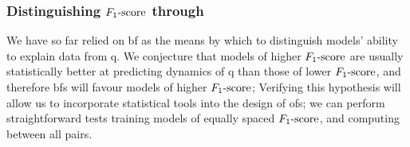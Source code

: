 \subsubsection{Distinguishing $ F_{1}\text{-score} $ through }\label{sec:bf_by_f_score}
We have so far relied on \gls{bf} as the means by which to distinguish models' 
    ability to explain data from \gls{q}. 
We conjecture that models of higher $ F_{1}\text{-score} $ are usually statistically better at predicting dynamics of \gls{q}
    than those of lower $ F_{1}\text{-score} $, and therefore \glspl{bf} will favour models of higher $ F_{1}\text{-score} $;
Verifying this hypothesis will allow us to incorporate statistical tools into the design of \glspl{of};
    we can perform straightforward tests training models of equally spaced $ F_{1}\text{-score} $, and computing  between all pairs.
\par 

